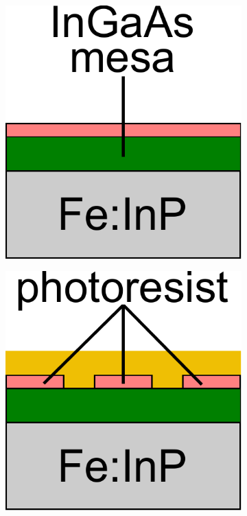\begin{figure}[h]
    \centering
    \begin{subfigure}[b]{0.225\textwidth}
        \centering
        \includegraphics[width=\textwidth]{figures/Fabrication/fab1_1.pdf}
        \caption{}
        \label{fig:fab11}
    \end{subfigure}
    \hfill
    \begin{subfigure}[b]{0.225\textwidth}
        \centering
        \includegraphics[width=\textwidth]{figures/Fabrication/fab1_2.pdf}

\end{subfigure}
\end{figure}
